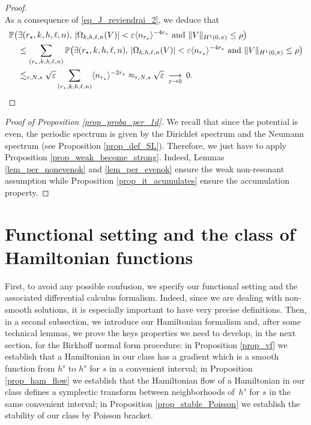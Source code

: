 \documentclass[11pt]{article}
\theoremstyle{definition}
\begin{document}
\begin{proof}
\[\]
As a consequence of \eqref{eq_J_reviendrai_2}, we deduce that
\begin{align*}
\mathbb{P}\big(&\exists (r_\star,k,h,\ell,n), \, |\Omega_{k,h,\ell,n}(V)| < \varepsilon \langle n_{r_\star} \rangle^{-4 r_\star} \ \text{and} \ \| V\|_{H^1(0,\pi)} \leq \rho \big) \\ & \leq \sum_{ (r_\star,k,h,\ell,n)} \mathbb{P}\big(\exists (r_\star,k,h,\ell,n), \, |\Omega_{k,h,\ell,n}(V)| < \varepsilon \langle n_{r_\star} \rangle^{-4 r_\star} \ \text{and} \ \| V\|_{H^1(0,\pi)} \leq \rho \big) \\
& \lesssim_{r,N,s} \sqrt{\varepsilon} \sum_{ (r_\star,k,h,\ell,n)} \langle n_{r_\star} \rangle^{-2 r_\star} \approx_{r,N,s} \sqrt{\varepsilon} \ \mathop{\longrightarrow}_{\varepsilon \to 0} \ 0.\qedhere
\end{align*}
\end{proof}

\begin{proof}[Proof of Proposition \ref{prop_proba_per_1d}] We recall that since the potential is even, the periodic spectrum is given by the Dirichlet spectrum and the Neumann spectrum (see Proposition \ref{prop_def_SL}). Therefore, we just have to apply Proposition \ref{prop_weak_become_strong}. Indeed, Lemmas \ref{lem_per_nonevenok} and \ref{lem_per_evenok} ensure the weak non-resonant assumption while Proposition \ref{prop_it_acumulates} ensure the accumulation property.
\end{proof}

\section{Functional setting and the class of Hamiltonian functions}
\label{sec_class_Ham}

First, to avoid any possible confusion, we specify our functional setting and the asso\-ciated differential calculus formalism. Indeed, since we are dealing with non-smooth solutions, it is especially important to have very precise definitions. Then, in a second subsection, we introduce our Hamiltonian formalism and, after some technical lemmas, we prove the keys properties we need to develop, in the next section, for the Birkhoff normal form procedure: in Proposition \ref{prop_vf} we establish that a Hamiltonian in our class has a gradient which is a smooth function from $h^s$ to $h^s$ for $s$ in a convenient interval; in Proposition \ref{prop_ham_flow} we establish that the Hamiltonian flow of a Hamiltonian in our class defines a symplectic transform between neighborhoods of~$h^s$ for $s$ in the same convenient interval; in Proposition \ref{prop_stable_Poisson} we establish the stability of our class by Poisson bracket.
\end{document}
